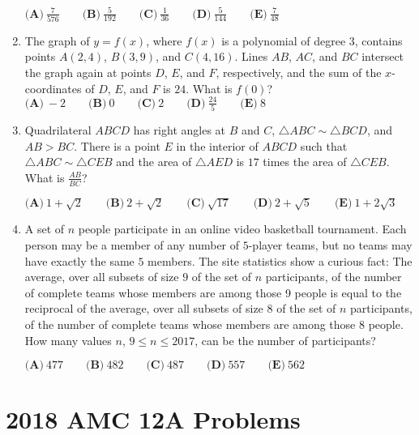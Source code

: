 \documentclass{article}
\begin{document}
\begin{enumerate}[label=\arabic*., itemsep=0.5em]
\(\textbf{(A)}\ \frac{7}{576} \qquad \textbf{(B)}\ \frac{5}{192} \qquad \textbf{(C)}\ \frac{1}{36} \qquad \textbf{(D)}\ \frac{5}{144} \qquad\textbf{(E)}\ \frac{7}{48}\)\par \vspace{0.5em}\item The graph of \(y=f(x)\), where \(f(x)\) is a polynomial of degree \(3\), contains points \(A(2,4)\), \(B(3,9)\), and \(C(4,16)\). Lines \(AB\), \(AC\), and \(BC\) intersect the graph again at points \(D\), \(E\), and \(F\), respectively, and the sum of the \(x\)-coordinates of \(D\), \(E\), and \(F\) is \(24\). What is \(f(0)\)?
\(\textbf{(A)}\ -2 \qquad \textbf{(B)}\ 0 \qquad \textbf{(C)}\ 2 \qquad \textbf{(D)}\ \frac{24}{5} \qquad\textbf{(E)}\ 8\)\par \vspace{0.5em}\item Quadrilateral \(ABCD\) has right angles at \(B\) and \(C\), \(\triangle ABC \sim \triangle BCD\), and \(AB > BC\). There is a point \(E\) in the interior of \(ABCD\) such that \(\triangle ABC \sim \triangle CEB\) and the area of \(\triangle AED\) is \(17\) times the area of \(\triangle CEB\). What is \(\frac{AB}{BC}\)?

\(\textbf{(A)}\ 1 + \sqrt{2} \qquad \textbf{(B)}\ 2 + \sqrt{2} \qquad \textbf{(C)}\ \sqrt{17} \qquad \textbf{(D)}\ 2 + \sqrt{5} \qquad\textbf{(E)}\ 1 + 2\sqrt{3}\)\par \vspace{0.5em}\item A set of \(n\) people participate in an online video basketball tournament. Each person may be a member of any number of \(5\)-player teams, but no teams may have exactly the same \(5\) members. The site statistics show a curious fact: The average, over all subsets of size \(9\) of the set of \(n\) participants, of the number of complete teams whose members are among those 9 people is equal to the reciprocal of the average, over all subsets of size \(8\) of the set of \(n\) participants, of the number of complete teams whose members are among those \(8\) people. How many values \(n\), \(9 \leq n \leq 2017\), can be the number of participants?

\(\textbf{(A)}\ 477 \qquad \textbf{(B)}\ 482 \qquad \textbf{(C)}\ 487 \qquad \textbf{(D)}\ 557 \qquad\textbf{(E)}\ 562\)\par \vspace{0.5em}\end{enumerate}\newpage\section*{2018 AMC 12A Problems}
\end{document}
